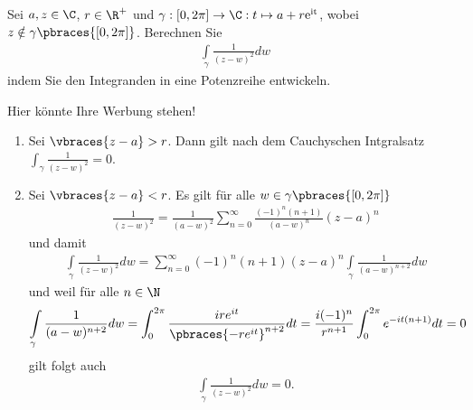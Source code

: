 \begin{exercise}
    Sei $a, z \in \C$, $r \in \R^+$ und $\gamma: [0, 2\pi] \to \C: t \mapsto a + r \rm{e}^{it}$, wobei $z \notin \gamma\pbraces{[0, 2\pi]}$. Berechnen Sie
    \begin{align*}
        \int\limits_\gamma \frac{1}{(z - w)^2} dw
    \end{align*} 
    indem Sie den Integranden in eine Potenzreihe entwickeln.
\end{exercise}
\begin{solution}
    Hier könnte Ihre Werbung stehen!
    \begin{enumerate}[label = Fall \arabic*:]
        \item Sei $\vbraces{z - a} > r$. Dann gilt nach dem Cauchyschen Intgralsatz $\int_\gamma \frac{1}{(z - w)^2} = 0$.
        \item Sei $\vbraces{z - a} < r$. Es gilt für alle $w \in \gamma\pbraces{[0, 2\pi]}$
        \begin{align*}
            \frac{1}{(z - w)^2} = \frac{1}{(a - w)^2} \sum_{n = 0}^\infty \frac{(-1)^n (n + 1) }{(a - w)^n} (z - a)^n   
        \end{align*}
        und damit
        \begin{align*}
            \int\limits_\gamma \frac{1}{(z - w)^2} dw = \sum_{n = 0}^\infty (-1)^n (n + 1) (z - a)^n \int\limits_\gamma \frac{1}{(a - w)^{n + 2}} dw
        \end{align*}
        und weil für alle $n \in \N$
        \begin{align*}
            \int\limits_\gamma \frac{1}{(a - w)^{n + 2}} dw  = \int_0^{2\pi} \frac{i r e^{it}}{\pbraces{- r e^{it}}^{n + 2}} dt = \frac{i(-1)^n}{r^{n + 1}} \int_0^{2\pi} e^{-it (n + 1)} dt = 0
        \end{align*}
        gilt folgt auch
        \begin{align*}
            \int\limits_\gamma \frac{1}{(z - w)^2} dw = 0.
        \end{align*}
    \end{enumerate}
\end{solution}